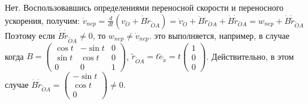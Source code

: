 Нет. Воспользовавшись определениями переносной скорости и переносного
ускорения, получим:
$\dot{v}_{nep}=\frac{d}{dt}\left(v_{\breve{O}}+\dot{B}
\tilde{r}_{\tilde{O}A}\right)=
\dot{v}_{\breve{O}}+\ddot{B}\tilde{r}_{\breve{O}A}+\dot{B}
\dot{\tilde{r}}_{\breve{O}A}=w_{nep}+\dot{B}
\dot{\tilde{r}}_{\tilde{O}A}$
Поэтому если $\dot{B}\dot{\tilde{r}}_{\tilde{O}A}\ne 0$, то $w_{nep}\ne
\dot{v}_{nep}$. это выполняется, например, в случае когда
$B=	\begin{pmatrix}
		\cos t & -\sin t & 0 \\
		\sin t & \cos t & 0 \\
		0 & 0 & 1
	\end{pmatrix}$, $\tilde{r}_{\tilde{O}A}=t\tilde{e}_{\tilde{x}}=
t	\begin{pmatrix}
		1 \\
		0 \\
		0
	\end{pmatrix}$.
 Действительно, в этом случае $\dot{B}\dot{\tilde{r}}_{\tilde{O}A}=
	\begin{pmatrix}
		-\sin t \\
		\cos t \\
		0
	\end{pmatrix}\ne 0$.
